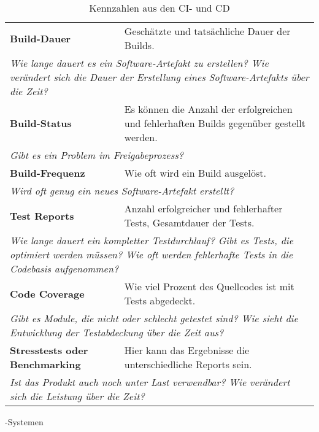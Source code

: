   \begin{table}[H]
    \centering
    \begin{tabular}{p{6.5cm}p{8cm}} \toprule
    \textbf{Build-Dauer} & Geschätzte und tatsächliche Dauer der Builds. \\
    \multicolumn{2}{p{14.5cm}}{\textit{Wie lange dauert es ein Software-Artefakt zu erstellen? \newline Wie verändert sich die Dauer der Erstellung eines Software-Artefakts über die Zeit?}} \\ \midrule
    \textbf{Build-Status} & Es können die Anzahl der erfolgreichen und fehlerhaften Builds gegenüber gestellt werden. \\
    \multicolumn{2}{p{14.5cm}}{\textit{Gibt es ein Problem im Freigabeprozess?}} \\ \midrule
    \textbf{Build-Frequenz} & Wie oft wird ein Build ausgelöst. \\
    \multicolumn{2}{p{14.5cm}}{\textit{Wird oft genug ein neues Software-Artefakt erstellt?}} \\ \midrule
    \textbf{Test Reports} & Anzahl erfolgreicher und fehlerhafter Tests, Gesamtdauer der Tests. \\
    \multicolumn{2}{p{14.5cm}}{\textit{Wie lange dauert ein kompletter Testdurchlauf? \newline Gibt es Tests, die optimiert werden müssen? \newline Wie oft werden fehlerhafte Tests in die Codebasis aufgenommen?}} \\ \midrule
    \textbf{Code Coverage} & Wie viel Prozent des Quellcodes ist mit Tests abgedeckt. \\
    \multicolumn{2}{p{14.5cm}}{\textit{Gibt es Module, die nicht oder schlecht getestet sind? \newline Wie sieht die Entwicklung der Testabdeckung über die Zeit aus?}} \\ \midrule
    \textbf{Stresstests oder Benchmarking} & Hier kann das Ergebnisse die unterschiedliche Reports sein. \\
    \multicolumn{2}{p{14.5cm}}{\textit{Ist das Produkt auch noch unter Last verwendbar? \newline Wie verändert sich die Leistung über die Zeit?}} \\ \bottomrule
    \end{tabular}
    \caption{Kennzahlen aus den \ac{CI}- und \ac{CD}}-Systemen\label{metrics-table-cicd}
  \end{table}
  

